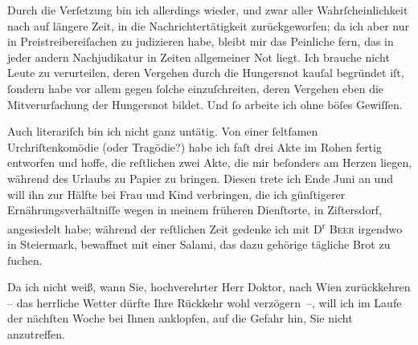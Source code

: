 \pstart
           Durch die Verſetzung bin ich allerdings wieder, und zwar aller Wahrſcheinlichkeit
               nach auf längere Zeit, in die Nachrichtertätigkeit zurückgeworfen; da ich aber nur in
               Preistreibereiſachen zu judizieren habe, bleibt mir das Peinliche fern, das in jeder
               andern Nachjudikatur in Zeiten allgemeiner Not liegt. Ich brauche nicht Leute zu
               verurteilen, deren Vergehen durch die Hungersnot kauſal begründet iſt,{ }ſondern habe
               vor allem gegen{ }ſolche einzuſchreiten, deren Vergehen {\pb}eben die Mitverurſachung der Hungersnot bildet. Und{ }ſo arbeite ich ohne böſes
               Gewiſſen.\pend
           
\pstart
           Auch literariſch bin ich nicht ganz untätig. Von einer{ }ſeltſamen Urchriſtenkomödie (oder Tragödie?) habe ich
               faſt drei Akte im Rohen fertig entworfen und hoffe, die reſtlichen zwei Akte, die mir
               beſonders am Herzen liegen, während des Urlaubs zu Papier zu bringen. Diesen trete
               ich Ende Juni an und will ihn zur Hälfte bei Frau und Kind verbringen, die ich günſtigerer Ernährungsverhältniſſe
               wegen in meinem früheren Dienſtorte, in Ziſtersdorf, angesiedelt habe; während der reſtlichen Zeit gedenke ich mit
                  D\textsuperscript{r}{ }\textsc{Beer} irgendwo in Steiermark, bewaffnet mit einer
               Salami, das dazu gehörige tägliche {\pb}Brot zu{ }ſuchen.\pend
           
\pstart
           Da ich nicht weiß, wann Sie, hochverehrter Herr Doktor, nach Wien zurückkehren – das herrliche Wetter dürfte Ihre Rückkehr
               wohl verzögern –, will ich im Laufe der nächſten Woche bei Ihnen anklopfen, auf die
               Gefahr hin, Sie nicht anzutreffen.\pend
           
